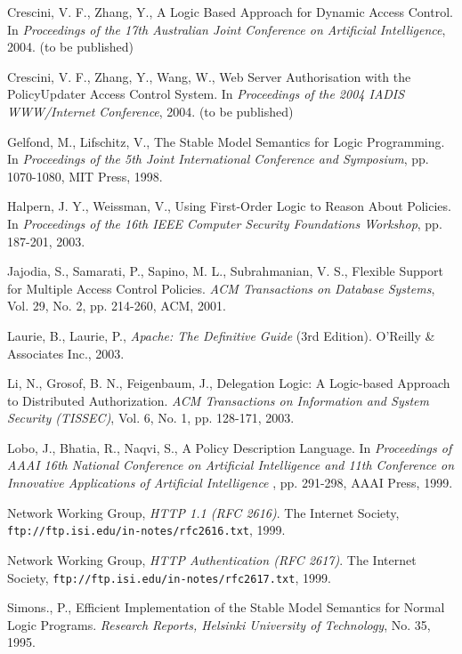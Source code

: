\documentclass[global,twocolumn,final]{svjour}
\begin{document}
\begin{thebibliography}{5}
      Crescini, V. F., Zhang, Y.,
      A Logic Based Approach for Dynamic Access Control.
      In {\em Proceedings of the 17th Australian Joint Conference on Artificial
      Intelligence},
      2004. (to be published)

      Crescini, V. F., Zhang, Y., Wang, W.,
      Web Server Authorisation with the PolicyUpdater Access Control System.
      In {\em Proceedings of the 2004 IADIS WWW/Internet Conference},
      2004. (to be published)

      Gelfond, M., Lifschitz, V.,
      The Stable Model Semantics for Logic Programming.
      In {\em Proceedings of the 5th Joint International Conference and
      Symposium},
      pp. 1070-1080, MIT Press, 1998.

      Halpern, J. Y., Weissman, V.,
      Using First-Order Logic to Reason About Policies.
      In {\em Proceedings of the 16th IEEE Computer Security Foundations
      Workshop}, pp. 187-201, 2003.

      Jajodia, S., Samarati, P., Sapino, M. L., Subrahmanian, V. S.,
      Flexible Support for Multiple Access Control Policies.
      {\em ACM Transactions on Database Systems},
      Vol. 29, No. 2, pp. 214-260, ACM, 2001.

      Laurie, B., Laurie, P.,
      {\em Apache: The Definitive Guide} (3rd Edition).
      O'Reilly \& Associates Inc., 2003.

      Li, N., Grosof, B. N., Feigenbaum, J.,
      Delegation Logic: A Logic-based Approach to Distributed Authorization.
      {\em ACM Transactions on Information and System Security (TISSEC)},
      Vol. 6, No. 1, pp. 128-171, 2003.

      Lobo, J., Bhatia, R., Naqvi, S.,
      A Policy Description Language.
      In {\em Proceedings of AAAI 16th National Conference on Artificial
      Intelligence and 11th Conference on Innovative Applications of Artificial
      Intelligence }, pp. 291-298, AAAI Press, 1999.

      Network Working Group,
      {\em HTTP 1.1 (RFC 2616)}.
      The Internet Society,
      {\tt \scriptsize ftp://ftp.isi.edu/in-notes/rfc2616.txt},
      1999.

      Network Working Group,
      {\em HTTP Authentication (RFC 2617)}.
      The Internet Society,
      {\tt \scriptsize ftp://ftp.isi.edu/in-notes/rfc2617.txt},
      1999.

      Simons., P.,
      Efficient Implementation of the Stable Model Semantics for Normal Logic
      Programs.
      {\em Research Reports, Helsinki University of Technology},
      No. 35, 1995.
  \end{thebibliography}
\end{document}

